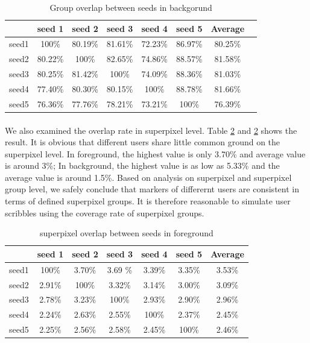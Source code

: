 \documentclass[runningheads,a4paper]{llncs}
\begin{document}
\begin{table}
\centering
\begin{tabular}{|c|c|c|c|c|c|c|c|}
\hline
 & seed 1 & seed 2&seed 3&seed 4&seed 5&Average\\
\hline
seed1& 100\% &80.19\% & 81.61\%& 72.23\%& 86.97\%&80.25\%\\
\hline
seed2& 80.22\% & 100\% & 82.65\%& 74.86\%& 88.57\%&81.58\% \\
\hline
seed3& 80.25\% & 81.42\% & 100\%& 74.09\%& 88.36\%&81.03\%\\
\hline
seed4& 77.40\% & 80.30\% & 80.15\%& 100\%& 88.78\%&81.66\% \\
\hline
seed5& 76.36\% & 77.76\% & 78.21\%& 73.21\%& 100\%&76.39\%\\
\hline
\end{tabular}
\caption{Group overlap between seeds in backgorund}
\label{ta: group overlap b}
\end{table} 

\paragraph{}We also examined the overlap rate in superpixel level. Table \ref{ta: sp overlap f} and \ref{ta: sp overlap f}  shows the result. It is obvious that different users share little common ground on the superpixel level. In foreground, the highest value is only 3.70\% and average value is around 3\%; In background, the highest value is as low as 5.33\% and the average value is around 1.5\%. Based on analysis on superpixel and superpixel group level, we safely conclude that markers of differernt users are consistent in terms of defined superpixel groups. It is therefore reasonable to simulate user scribbles using the coverage rate of superpixel groups.



\begin{table}
\centering
\begin{tabular}{|c|c|c|c|c|c|c|}
\hline
 & seed 1 & seed 2&seed 3&seed 4&seed 5&Average\\
\hline
seed1& 100\% & 3.70\% & 3.69	\%& 3.39\%& 3.35\%& 3.53\%\\
\hline
seed2& 2.91\% & 100\% & 3.32\%& 3.14\%& 3.00\% & 3.09\%\\
\hline
seed3& 2.78\% & 3.23\% & 100\%& 2.93\%& 2.90\%& 2.96\% \\
\hline
seed4& 2.24\% & 2.63\% & 2.55\%& 100\%& 2.37\%& 2.45\%\\
\hline
seed5& 2.25\% & 2.56\% & 2.58\%& 2.45\%& 100\%& 2.46\% \\
\hline
\end{tabular}
\caption{superpixel overlap between seeds in foreground }
\label{ta: sp overlap f}
\end{table} 
\end{document}
